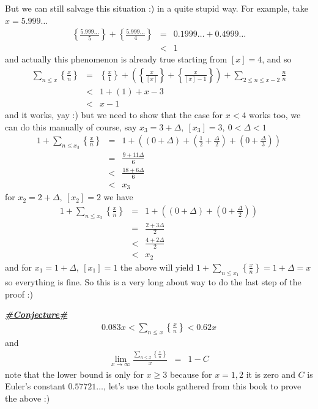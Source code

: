 \documentclass[aps,preprint,preprintnumbers,nofootinbib,showpacs,prd]{revtex4-1}
\newcommand{\nbea}{\begin{eqnarray*}}
\newcommand{\neea}{\end{eqnarray*}}
\begin{document}
But we can still salvage this situation :) in a quite stupid way. For example, take $x = 5.999\ldots$
%
\nbea
\left\{\frac{5.999\ldots}{5}\right\} + \left\{\frac{5.999\ldots}{4}\right\} & = & 0.1999\ldots + 0.4999\ldots \\
& < & 1
\neea
%
and actually this phenomenon is already true starting from $[x] = 4$, and so
%
\nbea
\sum_{n\le x} \left\{\frac{x}{n}\right\} & = & \left\{\frac{x}{1}\right\} + \left(\left\{\frac{x}{[x]}\right\} + \left\{\frac{x}{[x]-1}\right\}\right) + \sum_{2\le n\le x-2} \frac{n}{n} \\
& < & 1 + (1) + x-3 \\
& < & x - 1
\neea
%
and it works, yay :) but we need to show that the case for $x < 4$ works too, we can do this manually of course, say $x_3 = 3+\Delta,~[x_3] = 3,~0<\Delta<1$
%
\nbea
1 + \sum_{n\le x_3} \left\{\frac{x}{n}\right\} & = & 1 + \left( \left(0+\Delta\right) + \left(\frac{1}{2}+\frac{\Delta}{2}\right) + \left(0+\frac{\Delta}{3}\right) \right) \\
& = & \frac{9+11\Delta}{6} \\
& < & \frac{18+6\Delta}{6} \\
& < & x_3
\neea
%
for $x_2 = 2 + \Delta,~[x_2]=2$ we have
%
\nbea
1 + \sum_{n\le x_2} \left\{\frac{x}{n}\right\} & = & 1 + \left( \left(0+\Delta\right) + \left(0+\frac{\Delta}{2}\right) \right) \\
& = & \frac{2+3\Delta}{2} \\
& < & \frac{4+2\Delta}{2} \\
& < & x_2
\neea
%
and for $x_1 = 1 + \Delta,~[x_1]=1$ the above will yield $1 + \sum_{n\le x_1} \left\{\frac{x}{n}\right\} = 1 + \Delta = x$ so everything is fine. So this is a very long about way to do the last step of the proof :)

\underline{\textbf{\textit{\#Conjecture\#}}}
%
\nbea
0.083x < \sum_{n\le x}\left\{\frac{x}{n}\right\} < 0.62 x
\neea
%
and
%
\nbea
\lim_{x\to\infty}\frac{\sum_{n\le x}\left\{\frac{x}{n}\right\}}{x} & = & 1-C
\neea
%
note that the lower bound is only for $x \ge 3$ because for $x=1,2$ it is zero and $C$ is Euler's constant $0.57721\ldots$, let's use the tools gathered from this book to prove the above :)
\end{document}
